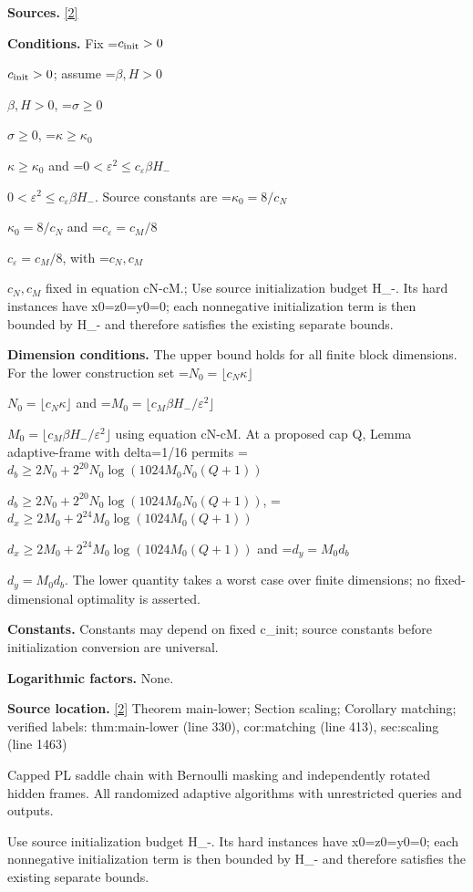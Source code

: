 \documentclass[10pt,a4paper]{article}
\newcommand{\AtlasMath}[1]{\par\begingroup\centering\setbox0=\hbox{$\displaystyle #1$}\ifdim\wd0>1.4\linewidth\typeout{ATLAS WIDE FORMULA: \the\wd0}\fi\ifdim\wd0>\linewidth\resizebox{\linewidth}{!}{\box0}\else\box0\fi\par\endgroup}
\newcommand{\AtlasInlineMath}[1]{\begingroup\setbox0=\hbox{$#1$}\ifdim\wd0>.4\linewidth\endgroup\AtlasMath{#1}\else\endgroup$#1$\fi}
\begin{document}
\textbf{Sources.} \href{https://github.com/WU-Wendao/Colombo/blob/main/colombo_sensorium/Complexity_altas/data/sources/colombo/N07/manuscript.pdf}{[2]}



\textbf{Conditions.} Fix \AtlasInlineMath{c_{\rm init}>0}; assume \AtlasInlineMath{\beta,H>0}, \AtlasInlineMath{\sigma\ge0}, \AtlasInlineMath{\kappa\ge\kappa_0} and \AtlasInlineMath{0<\varepsilon^2\le c_\varepsilon\beta H_-}. Source constants are \AtlasInlineMath{\kappa_0=8/c_N} and \AtlasInlineMath{c_\varepsilon=c_M/8}, with \AtlasInlineMath{c_N,c_M} fixed in equation cN-cM.; Use source initialization budget H\_-. Its hard instances have x0=z0=y0=0; each nonnegative initialization term is then bounded by H\_- and therefore satisfies the existing separate bounds.



\textbf{Dimension conditions.} The upper bound holds for all finite block dimensions. For the lower construction set \AtlasInlineMath{N_0=\lfloor c_N\kappa\rfloor} and \AtlasInlineMath{M_0=\lfloor c_M\beta H_-/\varepsilon^2\rfloor} using equation cN-cM. At a proposed cap Q, Lemma adaptive-frame with delta=1/16 permits \AtlasInlineMath{d_b\ge2N_0+2^{20}N_0\log(1024M_0N_0(Q+1))}, \AtlasInlineMath{d_x\ge2M_0+2^{24}M_0\log(1024M_0(Q+1))} and \AtlasInlineMath{d_y=M_0d_b}. The lower quantity takes a worst case over finite dimensions; no fixed-dimensional optimality is asserted.



\textbf{Constants.} Constants may depend on fixed c\_init; source constants before initialization conversion are universal.



\textbf{Logarithmic factors.} None.



\textbf{Source location.} \href{https://github.com/WU-Wendao/Colombo/blob/main/colombo_sensorium/Complexity_altas/data/sources/colombo/N07/manuscript.pdf}{[2]} Theorem main-lower; Section scaling; Corollary matching; verified labels: thm:main-lower (line 330), cor:matching (line 413), sec:scaling (line 1463)



Capped PL saddle chain with Bernoulli masking and independently rotated hidden frames. All randomized adaptive algorithms with unrestricted queries and outputs.



Use source initialization budget H\_-. Its hard instances have x0=z0=y0=0; each nonnegative initialization term is then bounded by H\_- and therefore satisfies the existing separate bounds.
\end{document}
